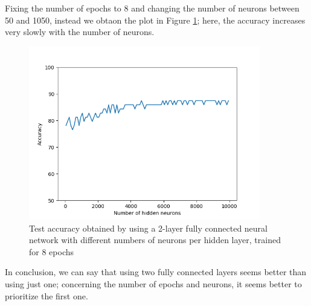 \documentclass[12pt]{article}
\begin{document}
Fixing the number of epochs to 8 and changing the number of neurons between 50 and 1050, instead we obtaon the plot in Figure \ref{fig:ex3_FCNN_neurons}; here, the accuracy increases very slowly with the number of neurons.
\begin{figure}[h]
	\centering
	\includegraphics[width = 0.9\textwidth]{ex3_FCNN2l_accuracy-neurons.png}
	\caption{Test accuracy obtained by using a 2-layer fully connected neural network with different numbers of neurons per hidden layer, trained for 8 epochs}
	\label{fig:ex3_FCNN_neurons}
\end{figure}
In conclusion, we can say that using two fully connected layers seems better than using just one; concerning the number of epochs and neurons, it seems better to prioritize the first one.
\end{document}
